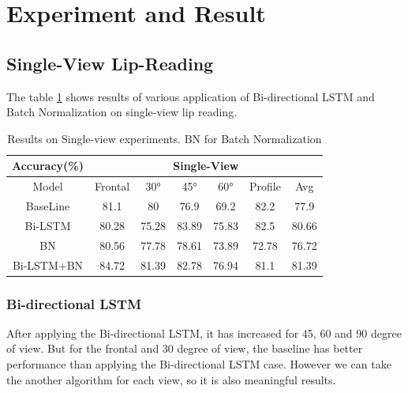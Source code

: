 
\section{Experiment and Result}

\subsection{Single-View Lip-Reading}
The table \ref{tab:singletb} shows results of various application of Bi-directional LSTM and Batch Normalization on single-view lip reading. 

\begin{table}[h]
\centering
    \begin{tabular}{c|cccccc}
        \multicolumn{1}{c|}{Accuracy(\%)} &%
        \multicolumn{6}{c}{Single-View}\\ \hline
        Model  &%
        Frontal & 30\si{\degree}& 45\si{\degree} & 60\si{\degree} & Profile & Avg\\\hline
        BaseLine%
        &%
        81.1& 80& 76.9& 69.2& 82.2&77.9\\
        Bi-LSTM%
        &%
        80.28& 75.28& 83.89& 75.83& 82.5&80.66\\
        BN%
        &%
        80.56& 77.78& 78.61& 73.89& 72.78&76.72\\
        Bi-LSTM+BN%
        &%
        84.72& 81.39& 82.78& 76.94& 81.1&81.39\\
    \end{tabular}
    \caption{Results on Single-view experiments. BN for Batch Normalization}
    \label{tab:singletb}
\end{table}

\subsubsection{Bi-directional LSTM}
After applying the Bi-directional LSTM, it has increased for 45, 60 and 90 degree of view. But for the frontal and 30 degree of view, the baseline has better performance than applying the Bi-directional LSTM case. However we can take the another algorithm for each view, so it is also meaningful results.
